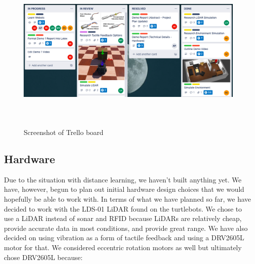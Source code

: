 \documentclass{article}
\begin{document}
\begin{table}[htbp!]
\begin{center}
\caption{Individual work of team members}
\label{table 1}
\end{center}
\vskip -3mm
\end{table}

\begin{figure}[htb!]
\begin{center}
  \includegraphics[width=1.01\textwidth,height=8cm]{Trello4.png}
  \caption{Screenshot of Trello board}
  \label{figure 2}
   \end{center}
\end{figure}
\newpage
\subsection{ Hardware}
Due to the situation with distance learning, we haven't built anything yet. We have, however, begun to plan out initial hardware design choices that we would hopefully be able to work with. In terms of what we have planned so far, we have decided to work with the LDS-01 LiDAR found on the turtlebots. We chose to use a LiDAR instead of sonar and RFID because LiDARs are relatively cheap, provide accurate data in most conditions, and provide great range.
\newline
We have also decided on using vibration as a form of tactile feedback and using a DRV2605L motor for that. We considered eccentric rotation motors as well but ultimately chose DRV2605L because:
\end{document}
